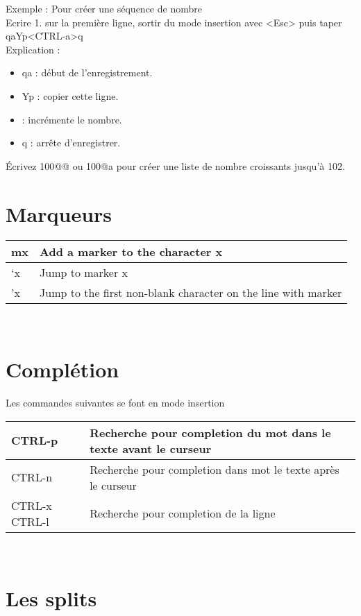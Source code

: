\documentclass{article}
\begin{document}
\noindent
Exemple : Pour créer une séquence de nombre\\
\noindent
Ecrire 1. sur la première ligne, sortir du mode insertion avec <Esc> puis taper qaYp<CTRL-a>q\\
Explication :
\begin{itemize}
\renewcommand{\labelitemi}{$\bullet$}
\item         qa : début de l'enregistrement.
\item         Yp : copier cette ligne.
\item         <CTRL-a> : incrémente le nombre.
\item         q : arrête d'enregistrer.
    \end{itemize}
    Écrivez 100@@ ou 100@a pour créer une liste de nombre croissants jusqu'à 102.
\section{Marqueurs}
\begin{tabular}{|p{3cm}| l|  }
	\hline
mx & Add a marker to the character x\\ \hline
	`x & Jump to marker x\\ \hline
	'x & Jump to the first non-blank character on the line with marker\\ \hline
\end{tabular}\\

\section{Complétion}
Les commandes suivantes se font en mode insertion\\


\begin{tabular}{|p{3cm}| l|  }
    \hline
CTRL-p & Recherche pour completion du mot dans le texte avant le curseur \\ \hline
CTRL-n & Recherche pour completion dans mot le texte après le curseur \\ \hline 
CTRL-x CTRL-l &	Recherche pour completion de la ligne \\ \hline
\end{tabular}\\


\section{Les splits} 
\end{document}
